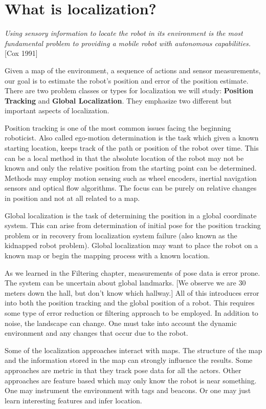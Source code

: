 \hypertarget{what-is-localization}{%
\section{What is localization?}\label{what-is-localization}}

\emph{Using sensory information to locate the robot in its environment
is the most fundamental problem to providing a mobile robot with
autonomous capabilities.} {[}Cox 1991{]}

Given a map of the environment, a sequence of actions and sensor
measurements, our goal is to estimate the robot's position and error of
the position estimate. There are two problem classes or types for
localization we will study: \textbf{Position Tracking} and
\textbf{Global Localization}. They emphasize two different but important
aspects of localization.

Position tracking is one of the most common issues facing the beginning
roboticist. Also called ego-motion determination is the task which given
a known starting location, keeps track of the path or position of the
robot over time. This can be a local method in that the absolute
location of the robot may not be known and only the relative position
from the starting point can be determined. Methods may employ motion
sensing such as wheel encoders, inertial navigation sensors and optical
flow algorithms. The focus can be purely on relative changes in position
and not at all related to a map.

Global localization is the task of determining the position in a global
coordinate system. This can arise from determination of initial pose for
the position tracking problem or in recovery from localization system
failure (also known as the kidnapped robot problem). Global localization
may want to place the robot on a known map or begin the mapping process
with a known location.

As we learned in the Filtering chapter, measurements of pose data is
error prone. The system can be uncertain about global landmarks. {[}We
observe we are 30 meters down the hall, but don't know which hallway.{]}
All of this introduces error into both the position tracking and the
global position of a robot. This requires some type of error reduction
or filtering approach to be employed. In addition to noise, the
landscape can change. One must take into account the dynamic environment
and any changes that occur due to the robot.

Some of the localization approaches interact with maps. The structure of
the map and the information stored in the map can strongly influence the
results. Some approaches are metric in that they track pose data for all
the actors. Other approaches are feature based which may only know the
robot is near something. One may instrument the environment with tags
and beacons. Or one may just learn interesting features and infer
location.

